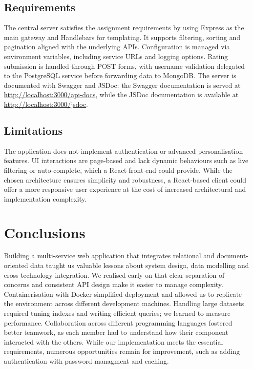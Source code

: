 \documentclass[12pt,a4paper]{article}
\begin{document}
\subsection{Requirements}

The central server satisfies the assignment requirements by using Express as the main gateway and Handlebars for templating. It supports filtering, sorting and pagination aligned with the underlying APIs. Configuration is managed via environment variables, including service URLs and logging options. Rating submission is handled through POST forms, with username validation delegated to the PostgreSQL service before forwarding data to MongoDB. The server is documented with Swagger and JSDoc: the Swagger documentation is served at \url{http://localhost:3000/api-docs}, while the JSDoc documentation is available at \url{http://localhost:3000/jsdoc}.

\subsection{Limitations}

The application does not implement authentication or advanced personalisation features. UI interactions are page-based and lack dynamic behaviours such as live filtering or auto-complete, which a React front-end could provide. While the chosen architecture ensures simplicity and robustness, a React-based client could offer a more responsive user experience at the cost of increased architectural and implementation complexity.

\section{Conclusions}

Building a multi-service web application that integrates relational and document-oriented data taught us valuable lessons about system design, data modelling and cross-technology integration. We realised early on that clear separation of concerns and consistent API design make it easier to manage complexity. Containerisation with Docker simplified deployment and allowed us to replicate the environment across different development machines. Handling large datasets required tuning indexes and writing efficient queries; we learned to measure performance. Collaboration across different programming languages fostered better teamwork, as each member had to understand how their component interacted with the others. While our implementation meets the essential requirements, numerous opportunities remain for improvement, such as adding authentication with password managment and caching.
\end{document}

